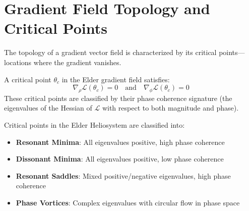 \section{Gradient Field Topology and Critical Points}

The topology of a gradient vector field is characterized by its critical points—locations where the gradient vanishes.

\begin{definition}
A critical point $\theta_c$ in the Elder gradient field satisfies:
\begin{equation}
\nabla_{\rho}\mathcal{L}(\theta_c) = 0 \quad \text{and} \quad \nabla_{\phi}\mathcal{L}(\theta_c) = 0
\end{equation}
These critical points are classified by their phase coherence signature (the eigenvalues of the Hessian of $\mathcal{L}$ with respect to both magnitude and phase).
\end{definition}

\begin{theorem}
Critical points in the Elder Heliosystem are classified into:
\begin{itemize}
    \item \textbf{Resonant Minima}: All eigenvalues positive, high phase coherence
    \item \textbf{Dissonant Minima}: All eigenvalues positive, low phase coherence
    \item \textbf{Resonant Saddles}: Mixed positive/negative eigenvalues, high phase coherence
    \item \textbf{Phase Vortices}: Complex eigenvalues with circular flow in phase space
\end{itemize}
\end{theorem}

